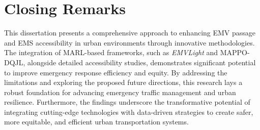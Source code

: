 \section{Closing Remarks}\label{sec:closing_remarks}
This dissertation presents a comprehensive approach to enhancing EMV passage and EMS accessibility in urban environments through innovative methodologies. The integration of MARL-based frameworks, such as \textit{EMVLight} and MAPPO-DQJL, alongside detailed accessibility studies, demonstrates significant potential to improve emergency response efficiency and equity. By addressing the limitations and exploring the proposed future directions, this research lays a robust foundation for advancing emergency traffic management and urban resilience. Furthermore, the findings underscore the transformative potential of integrating cutting-edge technologies with data-driven strategies to create safer, more equitable, and efficient urban transportation systems.
